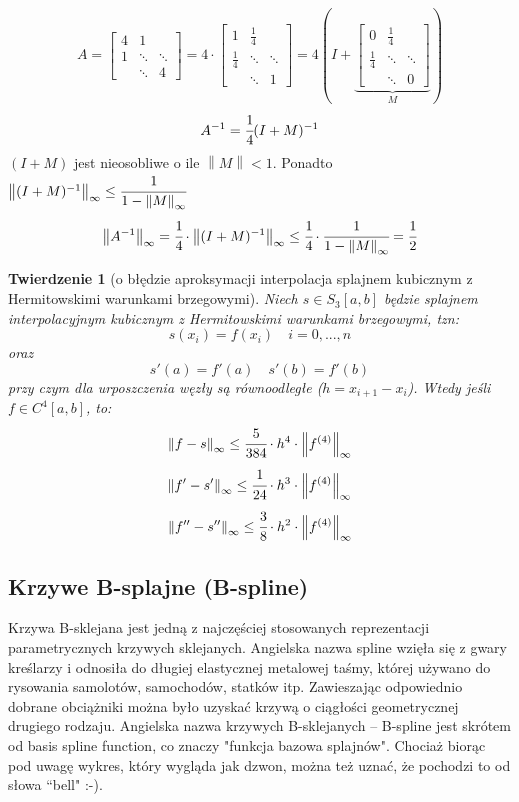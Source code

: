 \documentclass[hidelinks,a4paper,fleqn,oneside]{book}
\newcommand{\norm}[1]{\left\lVert#1\right\rVert}
\newtheorem{twierdz}{Twierdzenie}
\begin{document}
\[
	A = \left[
		\begin{array}{ccc}
		4 & 1 & \\
		1 & \ddots & \ddots \\
		& \ddots & 4
		\end{array}
	\right]
	 = 4 \cdot  \left[
		\begin{array}{ccc}
		1 & \frac{1}{4} & \\
		\frac{1}{4} & \ddots & \ddots \\
		& \ddots & 1
		\end{array}
	\right]
	= 4(I + \underbrace{\left[
		\begin{array}{ccc}
		0 & \frac{1}{4} & \\
		\frac{1}{4} & \ddots & \ddots \\
		& \ddots & 0
		\end{array}
	\right]}_{M})
\]
\[
	A^{-1} = \cfrac{1}{4} (I + M)^{-1}
\]
$(I + M)$ jest nieosobliwe o ile $\norm{M} < 1$. Ponadto $\norm{(I+M)^{-1}}_\infty \leq \cfrac{1}{1-\norm{M}_\infty}$
\[
	\norm{A^{-1}}_\infty = \cfrac{1}{4} \cdot \norm{(I+M)^{-1}}_\infty \leq \cfrac{1}{4} \cdot \cfrac{1}{1-\norm{M}_\infty} = \cfrac{1}{2}
\]

\begin{twierdz}[o błędzie aproksymacji interpolacja splajnem kubicznym z Hermitowskimi warunkami brzegowymi]
	Niech $s \in S_3[a, b]$ będzie splajnem interpolacyjnym kubicznym z Hermitowskimi warunkami brzegowymi, tzn: \[s(x_i) = f(x_i) \quad i=0, ..., n\] oraz \[s'(a) = f'(a) \quad s'(b) = f'(b)\] przy czym dla urposzczenia węzły są równoodległe ($h = x_{i+1}-x_i$). Wtedy jeśli $f \in C^4[a, b]$, to: 
	\[ 
		\norm{f-s}_\infty \leq \cfrac{5}{384} \cdot h^4 \cdot \norm{f^{(4)}}_\infty
	\]
	\[ 
		\norm{f'-s'}_\infty \leq \cfrac{1}{24} \cdot h^3 \cdot \norm{f^{(4)}}_\infty
	\]
	\[ 
		\norm{f''-s''}_\infty \leq \cfrac{3}{8} \cdot h^2 \cdot \norm{f^{(4)}}_\infty
	\]
\end{twierdz}

\subsection{Krzywe B-splajne (B-spline)}

Krzywa B-sklejana jest jedną z najczęściej stosowanych reprezentacji parametrycznych krzywych sklejanych. Angielska nazwa spline wzięła się z gwary kreślarzy i odnosiła do długiej elastycznej metalowej taśmy, której używano do rysowania samolotów, samochodów, statków itp. Zawieszając odpowiednio dobrane obciążniki można było uzyskać krzywą o ciągłości geometrycznej drugiego rodzaju. Angielska nazwa krzywych B-sklejanych – B-spline jest skrótem od basis spline function, co znaczy "funkcja bazowa splajnów". Chociaż biorąc pod uwagę wykres, który wygląda jak dzwon, można też uznać, że pochodzi to od słowa ``bell" :-).
\end{document}
